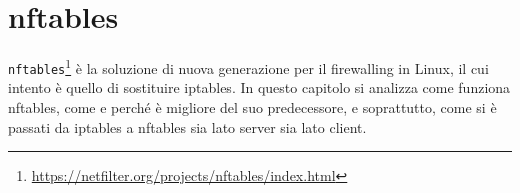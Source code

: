 \chapter{nftables}

\texttt{nftables}\footnote{\url{https://netfilter.org/projects/nftables/index.html}} è la soluzione di nuova generazione per il firewalling in
Linux, il cui intento è quello di sostituire iptables.
In questo capitolo si analizza come funziona nftables, come e perché è migliore
del suo predecessore, e soprattutto, come si è passati da iptables a nftables
sia lato server sia lato client.






